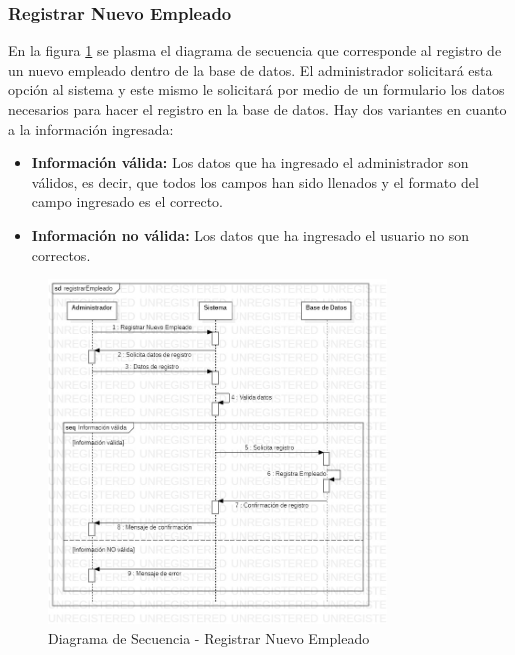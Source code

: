 \subsubsection{Registrar Nuevo Empleado}
En la figura \ref{fig:Diagrama de Secuencia - Registrar Nuevo Empleado} se plasma el diagrama de secuencia que corresponde al registro de un nuevo empleado dentro de la base de datos. El administrador solicitará esta opción al sistema y este mismo le solicitará por medio de un formulario los datos necesarios para hacer el registro en la base de datos. Hay dos variantes en cuanto a la información ingresada: 
\begin{itemize}
	\item \textbf{Información válida:} Los datos que ha ingresado el administrador son válidos, es decir, que todos los campos han sido llenados y el formato del campo ingresado es el correcto. 
	\item \textbf{Información no válida:} Los datos que ha ingresado el usuario no son correctos. 
\end{itemize}
\begin{figure}[!h]
	\centering
	\includegraphics[width=0.8\textwidth]{./diseno/vprocesos/imagenes/registrarEmpleado}
	\caption{Diagrama de Secuencia - Registrar Nuevo Empleado}
	\label{fig:Diagrama de Secuencia - Registrar Nuevo Empleado}
\end{figure}